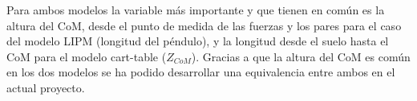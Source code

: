 Para ambos modelos la variable más importante y que tienen en común es la altura del CoM, desde el punto de medida de las fuerzas y los pares para el caso del modelo LIPM (longitud del péndulo), y la longitud desde el suelo hasta el CoM para el modelo cart-table ($Z_{CoM}$). Gracias a que la altura del CoM es común en los dos modelos se ha podido desarrollar una equivalencia entre ambos en el actual proyecto.

